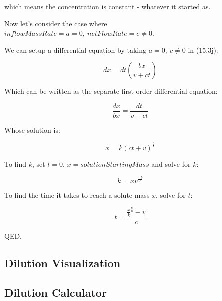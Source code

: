 \documentclass{article}
\begin{document}
which means the concentration is constant - whatever it started as.

Now let's consider the case where $inflowMassRate = a = 0,~netFlowRate = c \neq 0$.

We can setup a differential equation by taking $a = 0,~c \neq 0$ in (15.3j):

\[ dx = dt (\frac{bx}{v+ct}) \]

Which can be written as the separate first order differential equation:

\[ \frac{dx}{bx} = \frac{dt}{v+ct} \]

Whose solution is:

\[ x = k(ct+v)^{\frac{b}{c}} \]

To find $k$, set $t = 0$, $x = solutionStartingMass$ and solve for $k$:

\[ k = xv^{\frac{-b}{c}} \]

To find the time it takes to reach a solute mass $x$, solve for $t$:

\[ t = \frac{\frac{x}{k}^{\frac{c}{b}}-v}{c} \]

QED.

\subsection{Dilution Visualization}

\subsection{Dilution Calculator}
\end{document}
